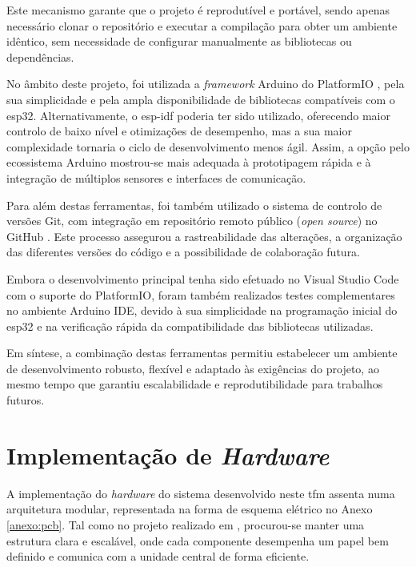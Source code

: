 Este mecanismo garante que o projeto é reprodutível e portável, sendo apenas necessário clonar o repositório e executar a compilação para obter um ambiente idêntico, sem necessidade de configurar manualmente as bibliotecas ou dependências.

No âmbito deste projeto, foi utilizada a \emph{framework} Arduino do PlatformIO \cite{platformio-arduino-framework}, pela sua simplicidade e pela ampla disponibilidade de bibliotecas compatíveis com o \gls{esp32}. Alternativamente, o \gls{esp-idf} poderia ter sido utilizado, oferecendo maior controlo de baixo nível e otimizações de desempenho, mas a sua maior complexidade tornaria o ciclo de desenvolvimento menos ágil. Assim, a opção pelo ecossistema Arduino  mostrou-se mais adequada à prototipagem rápida e à integração de múltiplos sensores e interfaces de comunicação.

Para além destas ferramentas, foi também utilizado o sistema de controlo de versões Git, com integração em repositório remoto público (\emph{open source}) no GitHub \cite{github-usv}. Este processo assegurou a rastreabilidade das alterações, a organização das diferentes versões do código e a possibilidade de colaboração futura.  

Embora o desenvolvimento principal tenha sido efetuado no Visual Studio Code com o suporte do PlatformIO, foram também realizados testes complementares no ambiente Arduino IDE, devido à sua simplicidade na programação inicial do \gls{esp32} e na verificação rápida da compatibilidade das bibliotecas utilizadas.

Em síntese, a combinação destas ferramentas permitiu estabelecer um ambiente de desenvolvimento robusto, flexível e adaptado às exigências do projeto, ao mesmo tempo que garantiu escalabilidade e reprodutibilidade para trabalhos futuros.

\section{Implementação de \emph{Hardware}}
\label{sec:implementacao-hardware}

A implementação do \emph{hardware} do sistema desenvolvido neste \gls{tfm} assenta numa arquitetura modular, representada na forma de esquema elétrico no Anexo \ref{anexo:pcb}. Tal como no projeto realizado em \cite{didactic-robot-thesis}, procurou-se manter uma estrutura clara e escalável, onde cada componente desempenha um papel bem definido e comunica com a unidade central de forma eficiente.


